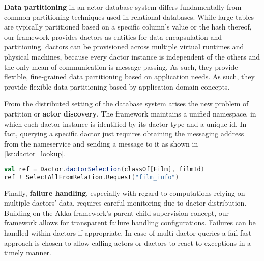 \textbf{Data partitioning} in an actor database system differs fundamentally from common partitioning techniques used in relational databases.
While large tables are typically partitioned based on a specific column's value or the hash thereof, our framework provides \glspl{dactor} as entities for data encapsulation and partitioning.
\Glspl{dactor} can be provisioned across multiple virtual runtimes and physical machines, because every \gls{dactor} instance is independent of the others and the only mean of communication is message passing.
As such, they provide flexible, fine-grained data partitioning based on application needs.
As such, they provide flexible data partitioning based by application-domain concepts.

From the distributed setting of the database system arises the new problem of partition or \textbf{actor discovery}.
The framework maintains a unified namespace, in which each \gls{dactor} instance is identified by its \gls{dactor} type and a unique id.
In fact, querying a specific \gls{dactor} just requires obtaining the messaging address from the nameservice and sending a message to it as shown in \cref{lst:dactor_lookup}.

\begin{minipage}{1.0\linewidth}
\begin{lstlisting}[caption=Lookup of and querying from a Film dactor instance., label=lst:dactor_lookup, language=Scala]
val ref = Dactor.dactorSelection(classOf[Film], filmId)
ref ! SelectAllFromRelation.Request("film_info")
\end{lstlisting}
\end{minipage}

Finally, \textbf{failure handling}, especially with regard to computations relying on multiple \glspl{dactor}' data, requires careful monitoring due to \gls{dactor} distribution.
Building on the Akka framework's parent-child supervision concept, our framework allows for transparent failure handling configurations.
Failures can be handled within \glspl{dactor} if appropriate.
In case of multi-\gls{dactor} queries a fail-fast approach is chosen to allow calling actors or \glspl{dactor} to react to exceptions in a timely manner.
